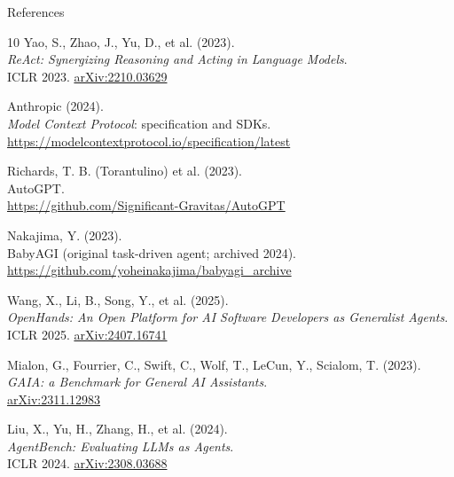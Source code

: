 \begin{frame}[allowframebreaks]{References}
  \small
  \begin{thebibliography}{10}
      Yao, S., Zhao, J., Yu, D., et al. (2023). \\
      \emph{ReAct: Synergizing Reasoning and Acting in Language Models}.\\
      ICLR 2023. \href{https://arxiv.org/abs/2210.03629}{arXiv:2210.03629}

      Anthropic (2024). \\
      \emph{Model Context Protocol}: specification and SDKs.\\
      \href{https://modelcontextprotocol.io/specification/latest}{https://modelcontextprotocol.io/specification/latest}

      Richards, T. B. (Torantulino) et al. (2023). \\
      AutoGPT.\\
      \href{https://github.com/Significant-Gravitas/AutoGPT}{https://github.com/Significant-Gravitas/AutoGPT}

      Nakajima, Y. (2023). \\
      BabyAGI (original task-driven agent; archived 2024).\\
      \href{https://github.com/yoheinakajima/babyagi_archive}{https://github.com/yoheinakajima/babyagi\_archive}

      Wang, X., Li, B., Song, Y., et al. (2025). \\
      \emph{OpenHands: An Open Platform for AI Software Developers as Generalist Agents}.\\
      ICLR 2025. \href{https://arxiv.org/abs/2407.16741}{arXiv:2407.16741}

      Mialon, G., Fourrier, C., Swift, C., Wolf, T., LeCun, Y., Scialom, T. (2023). \\
      \emph{GAIA: a Benchmark for General AI Assistants}.\\
      \href{https://arxiv.org/abs/2311.12983}{arXiv:2311.12983}

      Liu, X., Yu, H., Zhang, H., et al. (2024). \\
      \emph{AgentBench: Evaluating LLMs as Agents}.\\
      ICLR 2024. \href{https://arxiv.org/abs/2308.03688}{arXiv:2308.03688}


\end{thebibliography}
\end{frame}

